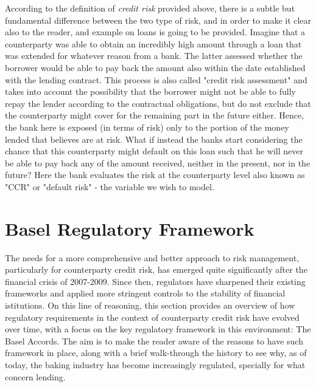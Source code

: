 \documentclass[a4paper,12pt]{article}
\begin{document}
        According to the definition of \textit{credit risk} provided above, there is a subtle but fundamental difference between the two type of risk, and in order to make it clear also to the reader, and example on loans is going
        to be provided. Imagine that a counterparty was able to obtain an incredibly high amount through a loan that was extended for whatever reason from a bank. The latter assessed whether the borrower would be able to 
        pay back the amount also within the date established with the lending contract. This process is also called "credit risk assessment" and takes into account the possibility that the borrower might not be able to fully repay the lender
        according to the contractual obligations, but do not exclude that the counterparty might cover for the remaining part in the future either. Hence, the bank here is exposed (in terms of risk) only to the portion of the money lended that
        believes are at risk. What if instead the banks start considering the chance that this counterparty might default on this loan such that he will never be able to pay back any of the amount received, neither in the present, nor in the future?
        Here the bank evaluates the risk at the counterparty level also known as "CCR" or "default risk" - the variable we wish to model.


    \pagebreak
    \section{Basel Regulatory Framework}

    The needs for a more comprehensive and better approach to risk management, particularly for counterparty credit risk,
    has emerged quite significantly after the financial crisis of 2007-2009. Since then, regulators have sharpened their 
    existing frameworks and applied more stringent controls to the stability of financial istitutions. 
    On this line of reasoning, this section provides an overview of how regulatory requirements in the context of counterparty credit
    risk have evolved over time, with a focus on the key regulatory framework in this environment: The Basel Accords. The aim is to make 
    the reader aware of the reasons to have such framework in place, along with a brief walk-through the history to see why, as of today, 
    the baking industry has become increasingly regulated, specially for what concern lending.
    \newline
\end{document}
